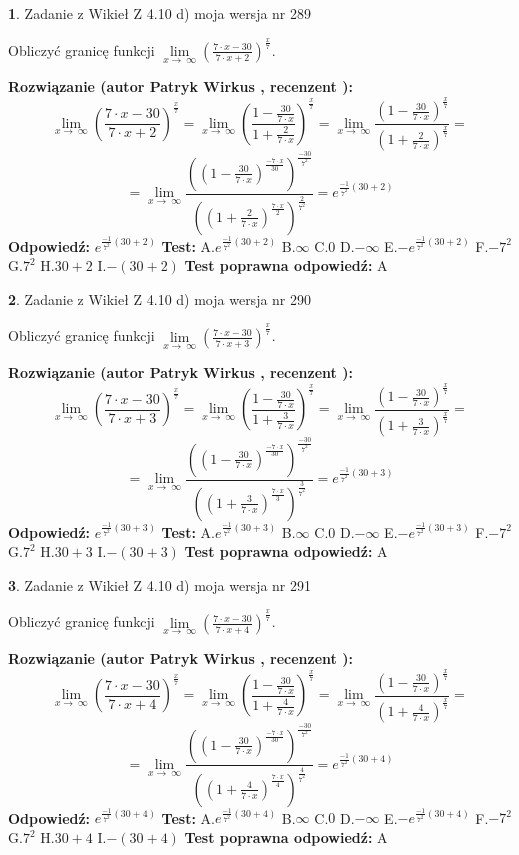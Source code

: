 \documentclass[12pt, a4paper]{article}
\theoremstyle{definition} %
\newtheorem{zad}{}
\newcommand{\zadStart}[1]{\begin{zad}#1\newline}
\newcommand{\zadStop}{\end{zad}}
\newcommand{\rozwStart}[2]{\noindent \textbf{Rozwiązanie (autor #1 , recenzent #2): }\newline}
\newcommand{\rozwStop}{\newline}
\newcommand{\odpStart}{\noindent \textbf{Odpowiedź:}\newline}
\newcommand{\odpStop}{\newline}
\newcommand{\testStart}{\noindent \textbf{Test:}\newline}
\newcommand{\testStop}{\newline}
\newcommand{\kluczStart}{\noindent \textbf{Test poprawna odpowiedź:}\newline}
\newcommand{\kluczStop}{\newline}
\begin{document}
\zadStart{Zadanie z Wikieł Z 4.10 d) moja wersja nr 289}


Obliczyć granicę funkcji  $\lim\limits_{x\to\ \infty}(\frac{7\cdot x-30}{7\cdot x+2})^{\frac{x}{7}}$.
\zadStop
\rozwStart{Patryk Wirkus}{}
$$\lim\limits_{x\to\ \infty}(\frac{7\cdot x-30}{7\cdot x+2})^{\frac{x}{7}} = \lim\limits_{x\to\ \infty}(\frac{1-\frac{30}{7\cdot x}}{1+\frac{2}{7\cdot x}})^{\frac{x}{7}}=\lim\limits_{x\to\ \infty}\frac{(1-\frac{30}{7\cdot x})^{\frac{x}{7}}}{(1+\frac{2}{7\cdot x})^{\frac{x}{7}}}=$$
$$=\lim\limits_{x\to\ \infty}\frac{((1-\frac{30}{7\cdot x})^{\frac{-7\cdot x}{30}})^{\frac{-30}{7^{2}}}}{((1+\frac{2}{7\cdot x})^{\frac{7\cdot x}{2}})^{\frac{2}{7^{2}}}}=e^{\frac{-1}{7^{2}}(30+2)}$$
\rozwStop
\odpStart
$e^{\frac{-1}{7^{2}}(30+2)}$
\odpStop
\testStart
A.$e^{\frac{-1}{7^{2}}(30+2)}$ B.$\infty$ C.$0$ D.$-\infty$ E.$-e^{\frac{-1}{7^{2}}(30+2)}$
F.$-7^{2}$ G.$7^{2}$
H.$30+2$
I.$-(30+2)$
\testStop
\kluczStart
A
\kluczStop



\zadStart{Zadanie z Wikieł Z 4.10 d) moja wersja nr 290}


Obliczyć granicę funkcji  $\lim\limits_{x\to\ \infty}(\frac{7\cdot x-30}{7\cdot x+3})^{\frac{x}{7}}$.
\zadStop
\rozwStart{Patryk Wirkus}{}
$$\lim\limits_{x\to\ \infty}(\frac{7\cdot x-30}{7\cdot x+3})^{\frac{x}{7}} = \lim\limits_{x\to\ \infty}(\frac{1-\frac{30}{7\cdot x}}{1+\frac{3}{7\cdot x}})^{\frac{x}{7}}=\lim\limits_{x\to\ \infty}\frac{(1-\frac{30}{7\cdot x})^{\frac{x}{7}}}{(1+\frac{3}{7\cdot x})^{\frac{x}{7}}}=$$
$$=\lim\limits_{x\to\ \infty}\frac{((1-\frac{30}{7\cdot x})^{\frac{-7\cdot x}{30}})^{\frac{-30}{7^{2}}}}{((1+\frac{3}{7\cdot x})^{\frac{7\cdot x}{3}})^{\frac{3}{7^{2}}}}=e^{\frac{-1}{7^{2}}(30+3)}$$
\rozwStop
\odpStart
$e^{\frac{-1}{7^{2}}(30+3)}$
\odpStop
\testStart
A.$e^{\frac{-1}{7^{2}}(30+3)}$ B.$\infty$ C.$0$ D.$-\infty$ E.$-e^{\frac{-1}{7^{2}}(30+3)}$
F.$-7^{2}$ G.$7^{2}$
H.$30+3$
I.$-(30+3)$
\testStop
\kluczStart
A
\kluczStop



\zadStart{Zadanie z Wikieł Z 4.10 d) moja wersja nr 291}


Obliczyć granicę funkcji  $\lim\limits_{x\to\ \infty}(\frac{7\cdot x-30}{7\cdot x+4})^{\frac{x}{7}}$.
\zadStop
\rozwStart{Patryk Wirkus}{}
$$\lim\limits_{x\to\ \infty}(\frac{7\cdot x-30}{7\cdot x+4})^{\frac{x}{7}} = \lim\limits_{x\to\ \infty}(\frac{1-\frac{30}{7\cdot x}}{1+\frac{4}{7\cdot x}})^{\frac{x}{7}}=\lim\limits_{x\to\ \infty}\frac{(1-\frac{30}{7\cdot x})^{\frac{x}{7}}}{(1+\frac{4}{7\cdot x})^{\frac{x}{7}}}=$$
$$=\lim\limits_{x\to\ \infty}\frac{((1-\frac{30}{7\cdot x})^{\frac{-7\cdot x}{30}})^{\frac{-30}{7^{2}}}}{((1+\frac{4}{7\cdot x})^{\frac{7\cdot x}{4}})^{\frac{4}{7^{2}}}}=e^{\frac{-1}{7^{2}}(30+4)}$$
\rozwStop
\odpStart
$e^{\frac{-1}{7^{2}}(30+4)}$
\odpStop
\testStart
A.$e^{\frac{-1}{7^{2}}(30+4)}$ B.$\infty$ C.$0$ D.$-\infty$ E.$-e^{\frac{-1}{7^{2}}(30+4)}$
F.$-7^{2}$ G.$7^{2}$
H.$30+4$
I.$-(30+4)$
\testStop
\kluczStart
A
\kluczStop
\end{document}
